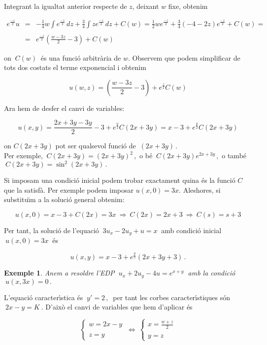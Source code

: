 \documentclass[12pt]{article}
\newtheorem{exemple}{Exemple}[subsection]
\begin{document}
Integrant la igualtat anterior respecte de $z$, deixant $w$ fixe, obtenim

\begin{eqnarray*}
 e^{\frac{-z}{2}} u&=&-\frac{1}{4}w\int e^{\frac{-z}{2}}\,dz+\frac{3}{4}\int z e^{\frac{-z}{2}}\,dz+C(w)=
\frac{1}{2}we^{\frac{-z}{2}}+\frac{3}{4}(-4-2z)e^{\frac{-z}{2}}+C(w)=\\
&&\\
&=&e^{\frac{-z}{2}}\left(\frac{w-3z}{2}-3\right)+C(w)
\end{eqnarray*}

on $\ C(w)\ $ {\'e}s una funci{\'o} arbitr{\`a}ria de $w.$ Observem que podem simplificar de tots dos costats el terme exponencial i obtenim

$$
u(w,z)=\left(\frac{w-3z}{2}-3\right)+e^{\frac{z}{2}}C(w)
$$

Ara hem de desfer el canvi de variables:

\[
 u(x,y)=\frac{2x+3y-3y}{2}-3+e^{\frac{y}{2}}C(2x+3y)=x-3+e^\frac{y}{2}C(2x+3y)
\]

on $C(2x+3y)$ pot ser qualsevol funci{\'o} de $\ (2x+3y)\,.$ \\

Per exemple, $\ C(2x+3y)=(2x+3y)^2\,,$ o b{\'e}  $\ C(2x+3y)e^{2x+3y}\,,$
 o tamb{\'e} $\ C(2x+3y)=\sin^2(2x+3y)\,.$


\vspace{0.4cm}
Si imposam una condici{\'o} inicial podem trobar exactament quina {\'e}s la funci{\'o} $C$ que la satisf{\`a}. Per
exemple podem imposar $u(x,0)=3x.$ Aleshores, si substitu{\"\i}m a la soluci{\'o} general obtenim:

\[
 u(x,0)=x-3+C(2x)=3x\ \Rightarrow\ C(2x)=2x+3\ \Rightarrow\ C(s)=s+3
\]

Per tant, la soluci{\'o} de l'equaci{\'o}  $\ 3u_x-2u_y+u=x\ $ amb condici{\'o} inicial $\ u(x,0)=3x\ $ {\'e}s

\[
 u(x,y)=x-3+e^{\frac{y}{2}} (2x+3y+3)\,.
\]


\vspace{0.8cm}
\begin{exemple}
Anem a resoldre l'EDP $\ u_x+2u_y-4u=e^{x+y}\ $ amb la condici{\'o} $\ u(x,3x)=0\,.$
\end{exemple}

L'equaci{\'o} caracter{\'\i}stica {\'e}s $\ y'= 2\,,\ $ per tant les corbes caracter{\'\i}stiques s{\'o}n $\ 2x-y=K\ $. D'aix{\`o} el canvi de variables que hem d'aplicar {\'e}s

\[
\left\{
 \begin{array}{l}
 w=2x-y\\
 \\
z=y
 \end{array}
 \right. \   \iff \
 \left\{
 \begin{array}{l}
 x=\frac{w+z}{2}\\
 \\
y=z
 \end{array}
 \right.
\]
\end{document}
